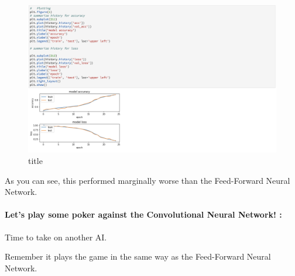 \documentclass[11pt]{article}
\makeatletter
\def\maxwidth{\ifdim\Gin@nat@width>\linewidth\linewidth
    \else\Gin@nat@width\fi}
\let\Oldincludegraphics\includegraphics
\renewcommand{\includegraphics}[1]{\Oldincludegraphics[width=.8\maxwidth]{#1}}
\makeatother
\begin{document}
    \begin{figure}[htbp]
\centering
\includegraphics{CNN_graph-V2.png}
\caption{title}
\end{figure}

    As you can see, this performed marginally worse than the Feed-Forward
Neural Network.

    \paragraph{Let's play some poker against the Convolutional Neural
Network!
:}\label{lets-play-some-poker-against-the-convolutional-neural-network}

    Time to take on another AI.

Remember it plays the game in the same way as the Feed-Forward Neural
Network.
\end{document}
